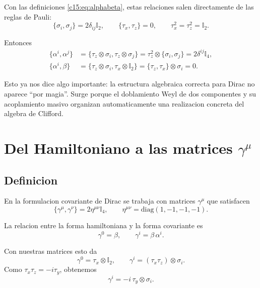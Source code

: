 Con las definiciones \eqref{c15:eq:alphabeta}, estas relaciones salen directamente de las reglas de Pauli:
\begin{equation}
\{\sigma_i,\sigma_j\}=2\delta_{ij}\mathbb{I}_2,
\qquad
\{\tau_x,\tau_z\}=0,
\qquad
\tau_x^2=\tau_z^2=\mathbb{I}_2.
\end{equation}

Entonces
\begin{align}
\{\alpha^i,\alpha^j\}
&=
\{\tau_z\otimes \sigma_i,\tau_z\otimes \sigma_j\}
=
\tau_z^2\otimes \{\sigma_i,\sigma_j\}
=
2\delta^{ij}\mathbb{I}_4,
\\
\{\alpha^i,\beta\}
&=
\{\tau_z\otimes \sigma_i,\tau_x\otimes \mathbb{I}_2\}
=
\{\tau_z,\tau_x\}\otimes \sigma_i
=
0.
\end{align}

Esto ya nos dice algo importante: la estructura algebraica correcta para Dirac no aparece \enquote{por magia}. Surge porque el doblamiento Weyl de dos componentes y su acoplamiento masivo organizan automaticamente una realizacion concreta del algebra de Clifford.

\section{\texorpdfstring{Del Hamiltoniano a las matrices \(\gamma^\mu\)}{Del Hamiltoniano a las matrices gamma^mu}}
\subsection{Definicion}
En la formulacion covariante de Dirac se trabaja con matrices $\gamma^\mu$ que satisfacen
\begin{equation}
\{\gamma^\mu,\gamma^\nu\}=2\eta^{\mu\nu}\mathbb{I}_4,
\qquad
\eta^{\mu\nu}=\mathrm{diag}(1,-1,-1,-1).
\label{c15:eq:cliff}
\end{equation}

La relacion entre la forma hamiltoniana y la forma covariante es
\begin{equation}
\gamma^0=\beta,
\qquad
\gamma^i=\beta\,\alpha^i.
\label{c15:eq:defgamma}
\end{equation}

Con nuestras matrices esto da
\begin{equation}
\gamma^0=\tau_x\otimes \mathbb{I}_2,
\qquad
\gamma^i=(\tau_x\tau_z)\otimes \sigma_i.
\end{equation}
Como $\tau_x\tau_z=-i\tau_y$, obtenemos
\begin{equation}
\gamma^i=-i\,\tau_y\otimes \sigma_i.
\label{c15:eq:gammatau}
\end{equation}

